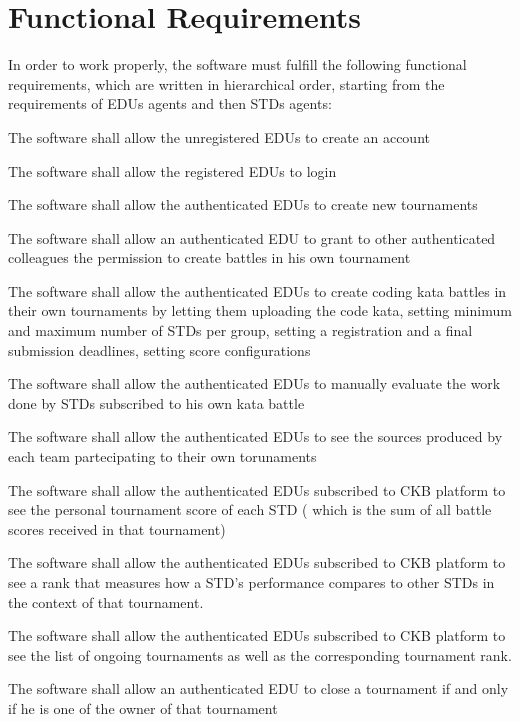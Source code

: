 {\color{red} \section{Functional Requirements}}
In order to work properly, the software must fulfill the following functional requirements, which are written in hierarchical order, starting from the requirements of EDUs agents and then STDs agents:
    \begin{requirementsenumerate}
        \item The software shall allow the unregistered EDUs to create an account 
        \item The software shall allow the registered EDUs to login
        \item The software shall allow the authenticated EDUs to create new tournaments
        \item The software shall allow an authenticated EDU to grant to other authenticated colleagues the permission to create battles in his own tournament
        \item The software shall allow the authenticated EDUs to create coding kata battles in their own tournaments by letting them uploading the code kata, setting minimum and maximum number of STDs per group, setting a registration and a final submission deadlines, setting score configurations
        \item The software shall allow the authenticated EDUs to manually evaluate the work done by STDs subscribed to his own kata battle
        \item The software shall allow the authenticated EDUs to see the sources produced by each team partecipating to their own torunaments
        \item The software shall allow the authenticated EDUs subscribed to CKB platform to see the personal tournament score of each STD ( which is the sum of all battle scores received in that tournament)
        \item The software shall allow the authenticated EDUs subscribed to CKB platform to see a rank that measures how a STD's performance compares to other STDs in the context of that tournament. 
        \item The software shall allow the authenticated EDUs subscribed to CKB platform to see the list of ongoing tournaments as well as the corresponding tournament rank.  
        \item The software shall allow an authenticated EDU to close a tournament if and only if he is one of the owner of that tournament

\end{requirementsenumerate}
